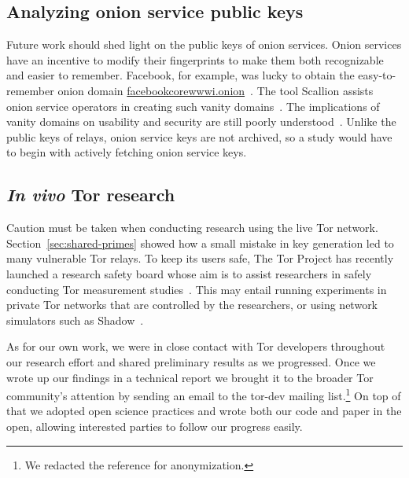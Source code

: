 \subsection{Analyzing onion service public keys}
Future work should shed light on the public keys of onion services.  Onion
services have an incentive to modify their fingerprints to make them both
recognizable and easier to remember.  Facebook, for example, was lucky to
obtain the easy-to-remember onion domain
\url{facebookcorewwwi.onion}~\cite{facebook}.  The tool Scallion assists onion
service operators in creating such vanity domains~\cite{scallion}.  The
implications of vanity domains on usability and security are still poorly
understood~\cite{vanity-domains}.  Unlike the public keys of relays, onion
service keys are not archived, so a study would have to begin with actively
fetching onion service keys.

\subsection{\textit{In vivo} Tor research}
Caution must be taken when conducting research using the live Tor network.
Section~\ref{sec:shared-primes} showed how a small mistake in key generation led
to many vulnerable Tor relays.  To keep its users safe, The Tor Project has
recently launched a research safety board whose aim is to assist researchers in
safely conducting Tor measurement studies~\cite{safety-board}.  This may entail
running experiments in private Tor networks that are controlled by the
researchers, or using network simulators such as Shadow~\cite{Jansen2012a}.

As for our own work, we were in close contact with Tor developers throughout our
research effort and shared preliminary results as we progressed.  Once we wrote
up our findings in a technical report we brought it to the broader Tor
community's attention by sending an email to the tor-dev mailing
list.\footnote{We redacted the reference for anonymization.}  On top of that we
adopted open science practices and wrote both our code and paper in the open,
allowing interested parties to follow our progress easily.

